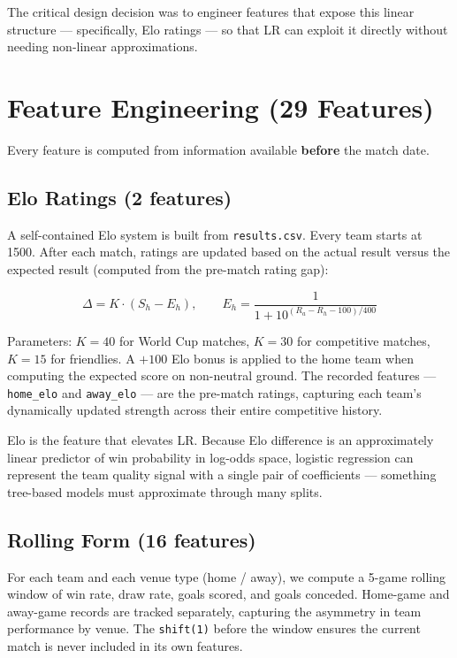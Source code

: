 \documentclass[12pt,a4paper,openany]{report}
\begin{document}
The critical design decision was to engineer features that expose this linear
structure --- specifically, Elo ratings --- so that LR can exploit it directly
without needing non-linear approximations.

\section{Feature Engineering (29 Features)}

Every feature is computed from information available \textbf{before} the match date.

\subsection{Elo Ratings (2 features)}

A self-contained Elo system is built from \texttt{results.csv}. Every team starts at
1500. After each match, ratings are updated based on the actual result versus
the expected result (computed from the pre-match rating gap):

\[
  \Delta = K \cdot (S_h - E_h), \qquad
  E_h = \frac{1}{1 + 10^{(R_a - R_h - 100)/400}}
\]

Parameters: $K = 40$ for World Cup matches, $K = 30$ for competitive matches,
$K = 15$ for friendlies. A $+100$ Elo bonus is applied to the home team when
computing the expected score on non-neutral ground. The recorded features ---
\texttt{home\_elo} and \texttt{away\_elo} --- are the pre-match ratings, capturing each
team's dynamically updated strength across their entire competitive history.

Elo is the feature that elevates LR. Because Elo difference is an
approximately linear predictor of win probability in log-odds space, logistic
regression can represent the team quality signal with a single pair of
coefficients --- something tree-based models must approximate through many splits.

\subsection{Rolling Form (16 features)}

For each team and each venue type (home / away), we compute a 5-game rolling
window of win rate, draw rate, goals scored, and goals conceded. Home-game and
away-game records are tracked separately, capturing the asymmetry in team
performance by venue. The \texttt{shift(1)} before the window ensures the current
match is never included in its own features.
\end{document}
